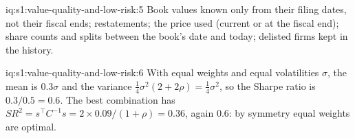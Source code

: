 \begin{solution}{iq:s1:value-quality-and-low-risk:5}
Book values known only from their filing dates, not their fiscal ends; restatements; the price used (current or at the fiscal end); share counts and splits
between the book's date and today; delisted firms kept in the history.
\end{solution}

\begin{solution}{iq:s1:value-quality-and-low-risk:6}
With equal weights and equal volatilities $\sigma$, the mean is $0.3\sigma$ and the variance $\frac14\sigma^2(2 + 2\rho) = \frac14\sigma^2$, so the Sharpe
ratio is $0.3/0.5 = 0.6$. The best combination has $SR^2 = s^\top C^{-1} s = 2 \times 0.09/(1 + \rho) = 0.36$, again 0.6: by symmetry equal weights are
optimal.
\end{solution}

